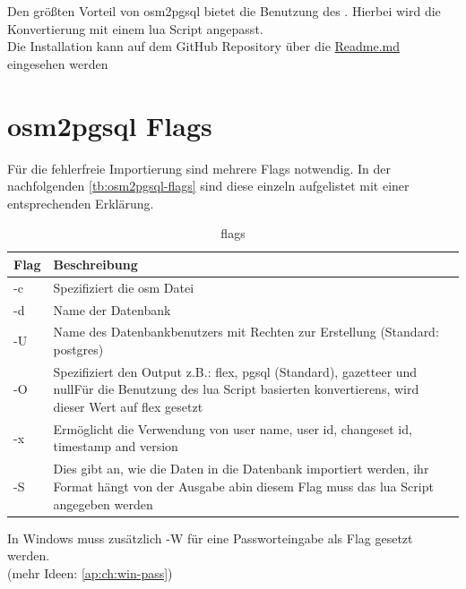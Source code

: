 Den größten Vorteil von osm2pgsql bietet die Benutzung des . Hierbei wird die Konvertierung mit einem lua Script angepasst.\\

Die Installation kann auf dem GitHub Repository über die \href{https://github.com/OpenHistoricalDataMap/OHDMConverter/tree/SteSad#readme}{Readme.md} eingesehen werden\\

\section{osm2pgsql Flags}
Für die fehlerfreie Importierung sind mehrere Flags notwendig. In der nachfolgenden \autoref{tb:osm2pgsql-flags} sind diese einzeln aufgelistet mit einer entsprechenden Erklärung.
\begin{table}[h]
	\caption{flags}
	\label{tb:osm2pgsql-flags}
	\renewcommand{\arraystretch}{1.5}
	\begin{tabularx}{\linewidth}{|l|X|}\hline
		Flag & Beschreibung\\\hline
		-c & Spezifiziert die osm Datei\\\hline
		-d & Name der Datenbank \\\hline
		-U & Name des Datenbankbenutzers mit Rechten zur Erstellung (Standard: postgres)\\\hline
		-O & Spezifiziert den Output z.B.: flex, pgsql (Standard), gazetteer und null\newline Für die Benutzung des lua Script basierten konvertierens, wird dieser Wert auf flex gesetzt\\\hline
		-x & Ermöglicht die Verwendung von user name, user id, changeset id, timestamp and version\\\hline
		-S & Dies gibt an, wie die Daten in die Datenbank importiert werden, ihr Format hängt von der Ausgabe ab\newline in diesem Flag muss das lua Script angegeben werden\\\hline		
	\end{tabularx}\vspace{0.5cm}
	In Windows muss zusätzlich -W für eine Passworteingabe als Flag gesetzt werden. \\(mehr Ideen: \autoref{ap:ch:win-pass})
\end{table}

\newpage
